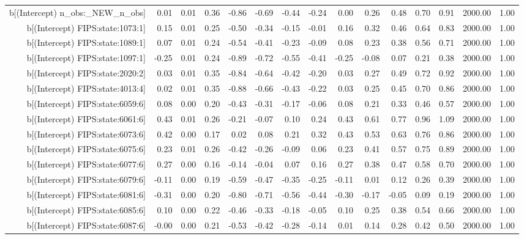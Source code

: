 \begin{table}[ht]
\begin{tabular}{rrrrrrrrrrrrrrr}
  b[(Intercept) n\_obs:\_NEW\_n\_obs] & 0.01 & 0.01 & 0.36 & -0.86 & -0.69 & -0.44 & -0.24 & 0.00 & 0.26 & 0.48 & 0.70 & 0.91 & 2000.00 & 1.00 \\ 
  b[(Intercept) FIPS:state:1073:1] & 0.15 & 0.01 & 0.25 & -0.50 & -0.34 & -0.15 & -0.01 & 0.16 & 0.32 & 0.46 & 0.64 & 0.83 & 2000.00 & 1.00 \\ 
  b[(Intercept) FIPS:state:1089:1] & 0.07 & 0.01 & 0.24 & -0.54 & -0.41 & -0.23 & -0.09 & 0.08 & 0.23 & 0.38 & 0.56 & 0.71 & 2000.00 & 1.00 \\ 
  b[(Intercept) FIPS:state:1097:1] & -0.25 & 0.01 & 0.24 & -0.89 & -0.72 & -0.55 & -0.41 & -0.25 & -0.08 & 0.07 & 0.21 & 0.38 & 2000.00 & 1.00 \\ 
  b[(Intercept) FIPS:state:2020:2] & 0.03 & 0.01 & 0.35 & -0.84 & -0.64 & -0.42 & -0.20 & 0.03 & 0.27 & 0.49 & 0.72 & 0.92 & 2000.00 & 1.00 \\ 
  b[(Intercept) FIPS:state:4013:4] & 0.02 & 0.01 & 0.35 & -0.88 & -0.66 & -0.43 & -0.22 & 0.03 & 0.25 & 0.45 & 0.70 & 0.86 & 2000.00 & 1.00 \\ 
  b[(Intercept) FIPS:state:6059:6] & 0.08 & 0.00 & 0.20 & -0.43 & -0.31 & -0.17 & -0.06 & 0.08 & 0.21 & 0.33 & 0.46 & 0.57 & 2000.00 & 1.00 \\ 
  b[(Intercept) FIPS:state:6061:6] & 0.43 & 0.01 & 0.26 & -0.21 & -0.07 & 0.10 & 0.24 & 0.43 & 0.61 & 0.77 & 0.96 & 1.09 & 2000.00 & 1.00 \\ 
  b[(Intercept) FIPS:state:6073:6] & 0.42 & 0.00 & 0.17 & 0.02 & 0.08 & 0.21 & 0.32 & 0.43 & 0.53 & 0.63 & 0.76 & 0.86 & 2000.00 & 1.00 \\ 
  b[(Intercept) FIPS:state:6075:6] & 0.23 & 0.01 & 0.26 & -0.42 & -0.26 & -0.09 & 0.06 & 0.23 & 0.41 & 0.57 & 0.75 & 0.89 & 2000.00 & 1.00 \\ 
  b[(Intercept) FIPS:state:6077:6] & 0.27 & 0.00 & 0.16 & -0.14 & -0.04 & 0.07 & 0.16 & 0.27 & 0.38 & 0.47 & 0.58 & 0.70 & 2000.00 & 1.00 \\ 
  b[(Intercept) FIPS:state:6079:6] & -0.11 & 0.00 & 0.19 & -0.59 & -0.47 & -0.35 & -0.25 & -0.11 & 0.01 & 0.12 & 0.26 & 0.39 & 2000.00 & 1.00 \\ 
  b[(Intercept) FIPS:state:6081:6] & -0.31 & 0.00 & 0.20 & -0.80 & -0.71 & -0.56 & -0.44 & -0.30 & -0.17 & -0.05 & 0.09 & 0.19 & 2000.00 & 1.00 \\ 
  b[(Intercept) FIPS:state:6085:6] & 0.10 & 0.00 & 0.22 & -0.46 & -0.33 & -0.18 & -0.05 & 0.10 & 0.25 & 0.38 & 0.54 & 0.66 & 2000.00 & 1.00 \\ 
  b[(Intercept) FIPS:state:6087:6] & -0.00 & 0.00 & 0.21 & -0.53 & -0.42 & -0.28 & -0.14 & 0.01 & 0.14 & 0.28 & 0.42 & 0.50 & 2000.00 & 1.00 \\ 

\end{tabular}
\end{table}
